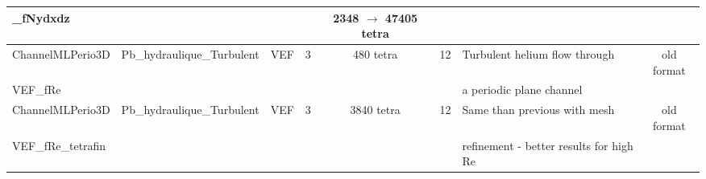 \begin{table}[H]
\begin{centering}
\begin{tabular}{lclccclc}
\rowcolor{SkyBlue!10}\_fNydxdz & & & & 2348 $\to$ 47405 tetra & & & \\
\hline
\rowcolor{SkyBlue!10}ChannelMLPerio3D & Pb\_hydraulique\_Turbulent & VEF & 3 & 480 tetra & 12 & Turbulent helium flow through & old format \\ 
\rowcolor{SkyBlue!10}VEF\_fRe & & & & & & a periodic plane channel &  \\
\hline
\rowcolor{SkyBlue!10}ChannelMLPerio3D & Pb\_hydraulique\_Turbulent & VEF & 3 & 3840 tetra & 12 & Same than previous with mesh & old format \\ 
\rowcolor{SkyBlue!10}VEF\_fRe\_tetrafin & & & & & & refinement - better results for high Re & \\
\hline
\end{tabular}
\end{centering}
\end{table}

\newpage

